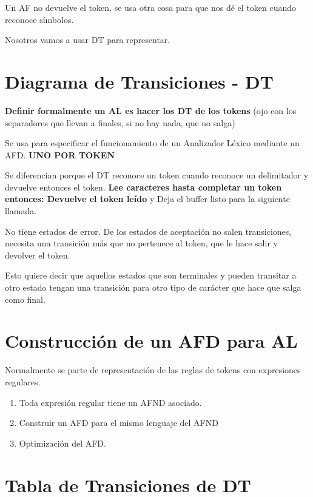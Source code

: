 \documentclass[12pt, twoside, openright]{report} %
\begin{document}
Un AF no devuelve el token, se usa otra cosa para que nos dé el token
cuando reconoce símbolos.

Nosotros vamos a usar DT para representar.


\section{Diagrama de Transiciones - DT}

\textbf{Definir formalmente un AL es hacer los DT de los tokens} (ojo
con los separadores que llevan a finales, si no hay nada, que no salga)

Se usa para especificar el funcionamiento de un Analizador Léxico
mediante un AFD. \textbf{UNO POR TOKEN}

Se diferencian porque el DT reconoce un token cuando reconoce un
delimitador y devuelve entonces el token. \textbf{Lee caracteres hasta
	completar un token entonces: Devuelve el token leído} y Deja el buffer
listo para la siguiente llamada.

No tiene estados de error. De los estados de aceptación no salen
transiciones, necesita una transición más que no pertenece al token, que
le hace salir y devolver el token.

Esto quiere decir que aquellos estados que son terminales y pueden
transitar a otro estado tengan una transición para otro tipo de carácter
que hace que salga como final.

\section{Construcción de un AFD para AL}

Normalmente se parte de representación de las reglas de tokens con
expresiones regulares.

\begin{enumerate}
	\def\labelenumi{\arabic{enumi}.}
	\item Toda expresión regular tiene un AFND asociado.
	\item Construir un AFD para el mismo lenguaje del AFND
	\item Optimización del AFD.
\end{enumerate}


\section{Tabla de Transiciones de DT}

\begin{figure}[H]
	{\def\svgwidth{.9\textwidth}
		}
\end{figure}
\end{document}
